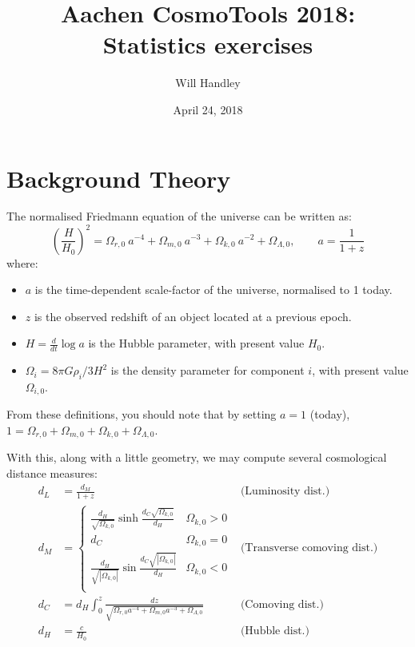 \documentclass{article}
\title{Aachen CosmoTools 2018:\\
Statistics exercises}
\author{Will Handley}
\date{April 24, 2018}
\begin{document}
\maketitle


\section*{Background Theory}

The normalised Friedmann equation of the universe can be written as:
\begin{equation}
    {\left( \frac{H}{H_0} \right)}^2 = \Omega_{r,0}\: a^{-4} + \Omega_{m,0}\: a^{-3} + \Omega_{k,0}\: a^{-2} + \Omega_{\Lambda,0}, \qquad a = \frac{1}{1+z}
    \label{eqn:friedmann}
\end{equation}
where:
\begin{itemize}
    \item $a$ is the time-dependent scale-factor of the universe, normalised to 1 today.
    \item $z$ is the observed redshift of an object located at a previous epoch.
    \item $H=\frac{d}{dt}\log a$ is the Hubble parameter, with present value $H_0$.
    \item $\Omega_i = {8\pi G \rho_i}/{3 H^2}$ is the density parameter for component $i$, with present value $\Omega_{i,0}$.
\end{itemize}
From these definitions, you should note that  by setting $a=1$ (today), $1 = \Omega_{r,0} + \Omega_{m,0} + \Omega_{k,0} + \Omega_{\Lambda,0}$.

With this, along with a little geometry, we may compute several cosmological distance measures:
\begin{align}
    d_L &= \frac{d_M}{1+z} 
    &\text{(Luminosity dist.)}\label{eqn:lum_dis}\\
    d_M &= \left\{
        \begin{array}{lr}
            \frac{d_H}{\sqrt{\Omega_{k,0}}}\sinh{}\frac{d_C\sqrt{\Omega_{k,0}}}{d_H}&\Omega_{k,0}>0\\
        d_C&\Omega_{k,0}=0\\
        \frac{d_H}{\sqrt{|\Omega_{k,0}|}}\sin{}\frac{d_C\sqrt{|\Omega_{k,0}|}}{d_H}&\Omega_{k,0}<0\\
        \end{array}
        \right.
        &\text{(Transverse comoving dist.)}\label{eqn:tra_dis}\\
        d_C &= d_H \int_{0}^{z} \frac{dz}{\sqrt{\Omega_{r,0}a^{-4} + \Omega_{m,0}a^{-3} + \Omega_{\Lambda,0}}}
    &\text{(Comoving dist.)}\label{eqn:com_dis}\\
    d_H &= \frac{c}{H_0}
    &\text{(Hubble dist.)}\label{eqn:hub_dis}
\end{align}
\end{document}
